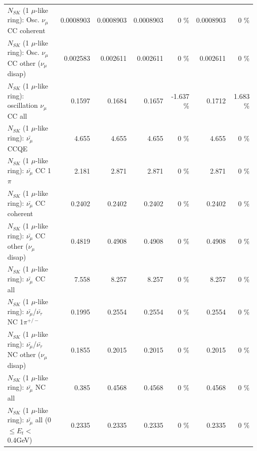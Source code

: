\begin{table}
\begin{tabular}{| l | r | r | r  r | r  r |}
                        $N_{SK}$ (1 $\mu$-like ring): Osc. $\nu_\mu$ CC coherent &       0.0008903 &       0.0008903 &       0.0008903 &        0 \%  &       0.0008903 &        0 \%  \\ 
         $N_{SK}$ (1 $\mu$-like ring): Osc. $\nu_\mu$ CC other ($\nu_\mu$ disap) &        0.002583 &        0.002611 &        0.002611 &        0 \%  &        0.002611 &        0 \%  \\ 
                      $N_{SK}$ (1 $\mu$-like ring): oscillation $\nu_\mu$ CC all &          0.1597 &          0.1684 &          0.1657 &   -1.637 \%  &          0.1712 &    1.683 \%  \\ 
\hline
\hline
                              $N_{SK}$ (1 $\mu$-like ring): $\bar{\nu_\mu}$ CCQE &           4.655 &           4.655 &           4.655 &        0 \%  &           4.655 &        0 \%  \\ 
                         $N_{SK}$ (1 $\mu$-like ring): $\bar{\nu_\mu}$ CC 1$\pi$ &           2.181 &           2.871 &           2.871 &        0 \%  &           2.871 &        0 \%  \\ 
                       $N_{SK}$ (1 $\mu$-like ring): $\bar{\nu_\mu}$ CC coherent &          0.2402 &          0.2402 &          0.2402 &        0 \%  &          0.2402 &        0 \%  \\ 
        $N_{SK}$ (1 $\mu$-like ring): $\bar{\nu_\mu}$ CC other ($\nu_\mu$ disap) &          0.4819 &          0.4908 &          0.4908 &        0 \%  &          0.4908 &        0 \%  \\ 
                          $N_{SK}$ (1 $\mu$-like ring): $\bar{\nu_{\mu}}$ CC all &           7.558 &           8.257 &           8.257 &        0 \%  &           8.257 &        0 \%  \\ 
\hline
  $N_{SK}$ (1 $\mu$-like ring): $\bar{\nu_\mu}$/$\bar{\nu_\tau}$ NC 1$\pi^{+/-}$ &          0.1995 &          0.2554 &          0.2554 &        0 \%  &          0.2554 &        0 \%  \\ 
$N_{SK}$ (1 $\mu$-like ring): $\bar{\nu_\mu}$/$\bar{\nu_\tau}$ NC other ($\nu_\mu$ disap) &          0.1855 &          0.2015 &          0.2015 &        0 \%  &          0.2015 &        0 \%  \\ 
                          $N_{SK}$ (1 $\mu$-like ring): $\bar{\nu_{\mu}}$ NC all &           0.385 &          0.4568 &          0.4568 &        0 \%  &          0.4568 &        0 \%  \\ 
\hline
   $N_{SK}$ (1 $\mu$-like ring): $\bar{\nu_{\mu}}$ all (0 $\leq E_{t} <$ 0.4GeV) &          0.2335 &          0.2335 &          0.2335 &        0 \%  &          0.2335 &        0 \%  \\ 

\end{tabular}
\end{table}
